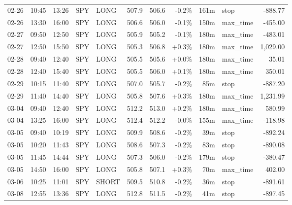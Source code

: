 \documentclass[11pt,a4paper,twoside]{article}
\begin{document}
\begin{center}
\begin{longtable}{>{\color{txtmain}}l l l l l r r r r >{\color{txtmain}}l r}
02-26 & 10:45 & 13:26 & SPY & LONG & 507.9 & 506.6 & \textcolor{lossred}{-0.2\%} & 161m & stop & \textcolor{lossred}{-888.77} \\
02-26 & 13:30 & 16:00 & SPY & LONG & 506.6 & 506.0 & \textcolor{lossred}{-0.1\%} & 150m & max\_time & \textcolor{lossred}{-455.00} \\
02-27 & 09:50 & 12:50 & SPY & LONG & 505.9 & 505.2 & \textcolor{lossred}{-0.1\%} & 180m & max\_time & \textcolor{lossred}{-483.01} \\
02-27 & 12:50 & 15:50 & SPY & LONG & 505.3 & 506.8 & \textcolor{wingreen}{+0.3\%} & 180m & max\_time & \textcolor{wingreen}{1,029.00} \\
02-28 & 09:40 & 12:40 & SPY & LONG & 505.5 & 505.6 & \textcolor{wingreen}{+0.0\%} & 180m & max\_time & \textcolor{wingreen}{35.01} \\
02-28 & 12:40 & 15:40 & SPY & LONG & 505.5 & 506.0 & \textcolor{wingreen}{+0.1\%} & 180m & max\_time & \textcolor{wingreen}{350.01} \\
02-29 & 10:15 & 11:40 & SPY & LONG & 507.0 & 505.7 & \textcolor{lossred}{-0.2\%} & 85m & stop & \textcolor{lossred}{-887.20} \\
02-29 & 11:40 & 14:40 & SPY & LONG & 505.8 & 507.6 & \textcolor{wingreen}{+0.3\%} & 180m & max\_time & \textcolor{wingreen}{1,231.99} \\
03-04 & 09:40 & 12:40 & SPY & LONG & 512.2 & 513.0 & \textcolor{wingreen}{+0.2\%} & 180m & max\_time & \textcolor{wingreen}{580.99} \\
03-04 & 13:25 & 16:00 & SPY & LONG & 512.4 & 512.2 & \textcolor{lossred}{-0.0\%} & 155m & max\_time & \textcolor{lossred}{-118.98} \\
03-05 & 09:40 & 10:19 & SPY & LONG & 509.9 & 508.6 & \textcolor{lossred}{-0.2\%} & 39m & stop & \textcolor{lossred}{-892.24} \\
03-05 & 10:20 & 11:43 & SPY & LONG & 508.6 & 507.3 & \textcolor{lossred}{-0.2\%} & 83m & stop & \textcolor{lossred}{-890.08} \\
03-05 & 11:45 & 14:44 & SPY & LONG & 507.3 & 506.0 & \textcolor{lossred}{-0.2\%} & 179m & stop & \textcolor{lossred}{-380.47} \\
03-05 & 14:50 & 16:00 & SPY & LONG & 505.8 & 507.1 & \textcolor{wingreen}{+0.3\%} & 70m & max\_time & \textcolor{wingreen}{402.00} \\
03-06 & 10:25 & 11:01 & SPY & SHORT & 509.5 & 510.8 & \textcolor{lossred}{-0.2\%} & 36m & stop & \textcolor{lossred}{-891.61} \\
03-08 & 12:55 & 13:36 & SPY & LONG & 512.8 & 511.5 & \textcolor{lossred}{-0.2\%} & 41m & stop & \textcolor{lossred}{-897.45} \\

\end{longtable}
\end{center}
\end{document}
